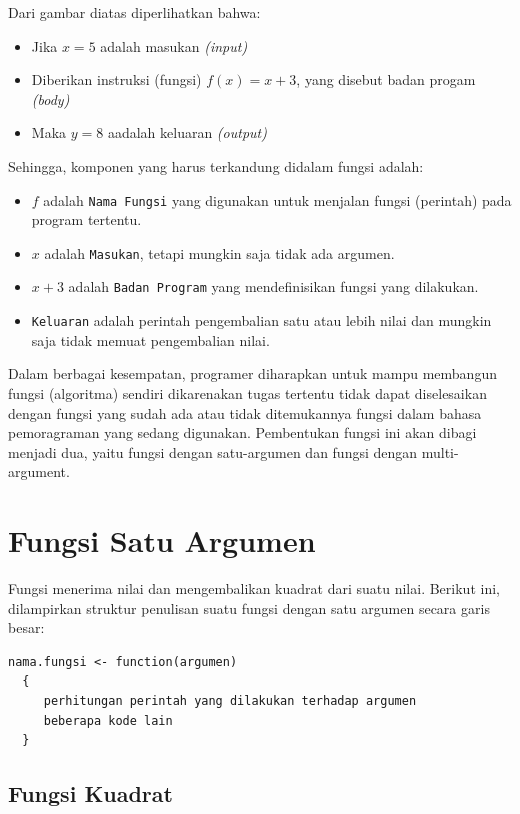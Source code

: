 \documentclass[
]{book}
\providecommand{\tightlist}{%
  \setlength{\itemsep}{0pt}\setlength{\parskip}{0pt}}
\begin{document}
Dari gambar diatas diperlihatkan bahwa:

\begin{itemize}
\tightlist
\item
  Jika \(x=5\) adalah masukan \emph{(input)}
\item
  Diberikan instruksi (fungsi) \(f(x)=x+3\), yang disebut badan progam \emph{(body)}
\item
  Maka \(y=8\) aadalah keluaran \emph{(output)}
\end{itemize}

Sehingga, komponen yang harus terkandung didalam fungsi adalah:

\begin{itemize}
\tightlist
\item
  \(f\) adalah \texttt{Nama\ Fungsi} yang digunakan untuk menjalan fungsi (perintah) pada program tertentu.
\item
  \(x\) adalah \texttt{Masukan}, tetapi mungkin saja tidak ada argumen.
\item
  \(x+3\) adalah \texttt{Badan\ Program} yang mendefinisikan fungsi yang dilakukan.
\item
  \texttt{Keluaran} adalah perintah pengembalian satu atau lebih nilai dan mungkin saja tidak memuat pengembalian nilai.
\end{itemize}

Dalam berbagai kesempatan, programer diharapkan untuk mampu membangun fungsi (algoritma) sendiri dikarenakan tugas tertentu tidak dapat diselesaikan dengan fungsi yang sudah ada atau tidak ditemukannya fungsi dalam bahasa pemoragraman yang sedang digunakan. Pembentukan fungsi ini akan dibagi menjadi dua, yaitu fungsi dengan satu-argumen dan fungsi dengan multi-argument.

\hypertarget{fungsi-satu-argumen}{%
\section{Fungsi Satu Argumen}\label{fungsi-satu-argumen}}

Fungsi menerima nilai dan mengembalikan kuadrat dari suatu nilai. Berikut ini, dilampirkan struktur penulisan suatu fungsi dengan satu argumen secara garis besar:

\begin{verbatim}
nama.fungsi <- function(argumen)
  {
     perhitungan perintah yang dilakukan terhadap argumen
     beberapa kode lain
  } 
\end{verbatim}

\hypertarget{fungsi-kuadrat}{%
\subsection{Fungsi Kuadrat}\label{fungsi-kuadrat}}
\end{document}
